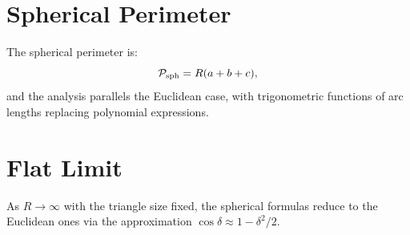 \section{Spherical Perimeter}
The spherical perimeter is:
\begin{equation}
\mathcal{P}_{\text{sph}} = R(a + b + c),
\end{equation}
and the analysis parallels the Euclidean case, with trigonometric functions of arc lengths replacing polynomial expressions.

\section{Flat Limit}
As $R \to \infty$ with the triangle size fixed, the spherical formulas reduce to the Euclidean ones via the approximation $\cos\delta \approx 1 - \delta^2/2$.
